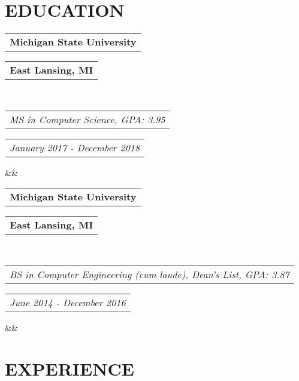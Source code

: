 \documentclass[11pt,a4paper,roman]{moderncv}        %
\makeatletter
\newcommand*{\customcventry}[7][.25em]{
  \begin{tabular}{@{}l} 
    {\bfseries #4}
  \end{tabular}
  \hfill%
  \begin{tabular}{l@{}}
     {\bfseries #5}
  \end{tabular} \\
  \begin{tabular}{@{}l} 
    {\small\itshape #3}
  \end{tabular}
  \hfill%
  \begin{tabular}{l@{}}
     {\small\itshape #2}
  \end{tabular}
  \ifx&#7&%
  \else{\\%
    \begin{minipage}{\maincolumnwidth}%
      \small#7%
    \end{minipage}}\fi%
  \par\addvspace{#1}}
\makeatother
\begin{document}
  
\vspace*{-20mm}
\makecvtitle
\vspace*{-23mm}

\begin{center}
\begin{tabular}{ c c c c }
\end{tabular}
\end{center}



\section{EDUCATION}
{\customcventry{January 2017 - December 2018}{MS in Computer Science, GPA: 3.95}{Michigan State University}{East Lansing, MI}{}{}}
{\customcventry{June 2014 - December 2016}{BS in Computer Engineering (cum laude), Dean's List, GPA: 3.87}{Michigan State University}{East Lansing, MI}{}{}}



\section{EXPERIENCE}
\end{document}
